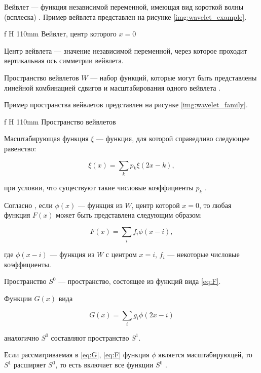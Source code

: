 Вейвлет --- функция независимой переменной, имеющая вид короткой волны (всплеска) \cite{Kryzhevich,Smolentsev,Malla}. Пример вейвлета представлен на рисунке \ref{img:wavelet_example}.

 {f} {H} {110mm}%
{Вейвлет, центр которого $x=0$}

Центр вейвлета --- значение независимой переменной, через которое проходит вертикальная ось симметрии вейвлета.

Пространство вейвлетов $W$ --- набор функций, которые могут быть представлены линейной комбинацией сдвигов и масштабирования одного вейвлета \cite{Novikov,Meyer}.

Пример пространства вейвлетов представлен на рисунке \ref{img:wavelet_family}.

 {f} {H} {110mm}%
{Пространство вейвлетов}

Масштабирующая функция $\xi$ --- функция, для которой справедливо следующее равенство:

\begin{equation}\label{eq:refine}
	\xi(x)=\sum_{k}p_k\xi(2x-k),
\end{equation}

при условии, что существуют такие числовые коэффициенты $p_k$ \cite{pixar,Novikov}.

Согласно \cite{pixar}, если $\phi(x)$ --- функция из $W$, центр которой $x=0$, то любая функция $F(x)$ может быть представлена следующим образом:

\begin{equation}\label{eq:F}
	F(x)=\sum_{i}f_i\phi(x-i),
\end{equation}

где $\phi(x-i)$ --- функция из $W$ с центром $x=i$, $f_i$ --- некоторые числовые коэффициенты.

Пространство $S^0$ --- пространство, состоящее из функций вида \ref{eq:F}.

Функции $G(x)$ вида

\begin{equation}\label{eq:G}
	G(x)=\sum_{i}g_i\phi(2x-i)
\end{equation}

аналогично $S^0$ составляют пространство $S^1$. \cite{pixar}

Если рассматриваемая в \ref{eq:G}, \ref{eq:F} функция $\phi$ является масштабирующей, то $S^1$ расширяет $S^0$, то есть включает все функции $S^0$ \cite{pixar,Novikov}.

